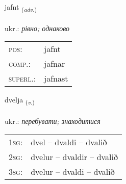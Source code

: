 \documentclass[frontgrid, backgrid]{flacards}\usepackage[]{graphicx}\usepackage[]{xcolor}
\begin{document}
\renewcommand{\flhead}{\vskip5pt \fboxsep=0pt {\small\bfseries\footnotesize Atviksorð | прислівник}}
\renewcommand{\fcfoot}{\vskip5pt \fboxsep=0pt \hspace{2pt}{\small\bfseries\footnotesize 2K}}

\renewcommand{\blhead}{\vskip5pt {\small\bfseries\footnotesize Atviksorð | прислівник }}
\renewcommand{\bcfoot}{\vskip5pt \hspace{2pt}{\small\bfseries\footnotesize 2K}}


{jafnt \small{\textsubscript{(\textit{adv.})}} \\[1ex] %
\textphonetic{[jam̥t]} \\
ukr.: \emph{рівно; однаково} \\  [2ex]
\renewcommand*{\arraystretch}{0.8}
\begin{tabular}{ll}
\textsc{pos}: & jafnt \\ 
\textsc{comp.}: & jafnar \\ 
\textsc{superl.}: & jafnast \\
\end{tabular}
}

\renewcommand{\flhead}{\vskip5pt \fboxsep=0pt {\small\bfseries\footnotesize Sagnorð | дієслово}}
\renewcommand{\fcfoot}{\vskip5pt \fboxsep=0pt \hspace{2pt}{\small\bfseries\footnotesize 2K}}

\renewcommand{\blhead}{\vskip5pt {\small\bfseries\footnotesize Sagnorð | дієслово }}
\renewcommand{\bcfoot}{\vskip5pt \hspace{2pt}{\small\bfseries\footnotesize 2K}}


{dvelja \small{\textsubscript{(\textit{v.})}} \\[1ex] %
\textphonetic{[tvɛlja]} \\
ukr.: \emph{перебувати; знаходитися} \\  [2ex]
\renewcommand*{\arraystretch}{0.8}
\begin{tabular}{p{1cm}l}
\textsc{1sg}: & dvel -- dvaldi -- dvalið \\ 
\textsc{2sg}: & dvelur -- dvaldir -- dvalið \\ 
\textsc{3sg}: & dvelur -- dvaldi -- dvalið \\ 
\end{tabular}
}
\end{document}
